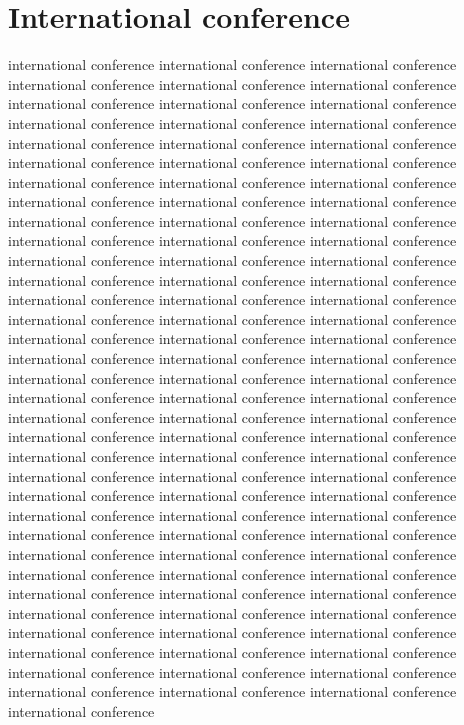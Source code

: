 \documentclass[12pt,a4paper,oneside,onecolumn,fleqn,dvipdfmx,report]{jsbook}
\begin{document}
\section*{International conference}
international conference international conference international conference international conference international conference international conference international conference international conference international conference international conference international conference international conference international conference international conference international conference international conference international conference international conference international conference international conference international conference international conference international conference international conference international conference international conference international conference international conference international conference international conference international conference international conference international conference international conference international conference international conference international conference international conference international conference international conference international conference international conference international conference international conference international conference international conference international conference international conference international conference international conference international conference international conference international conference international conference international conference international conference international conference international conference international conference international conference international conference international conference international conference international conference international conference international conference international conference international conference international conference international conference international conference international conference international conference international conference international conference international conference international conference international conference international conference international conference international conference international conference international conference international conference international conference international conference international conference international conference international conference international conference international conference international conference international conference international conference international conference international conference international conference international conference international conference international conference
\end{document}
